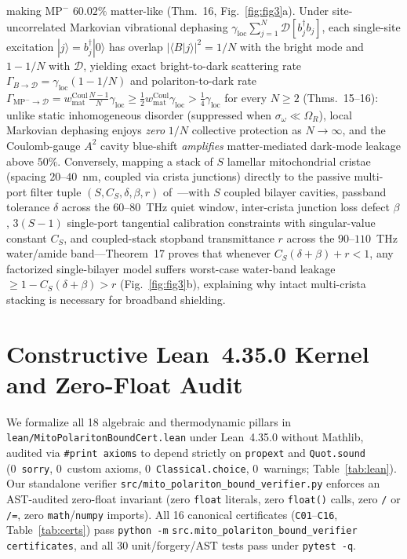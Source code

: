 \documentclass[10pt,twocolumn]{article}
\begin{document}
making $\mathrm{MP}^-$ $60.02\%$ matter-like (Thm.~16, Fig.~\ref{fig:fig3}a). Under site-uncorrelated Markovian vibrational dephasing $\gamma_{\mathrm{loc}}\sum_{j=1}^N\mathcal{D}[b_j^\dagger b_j]$, each single-site excitation $|j\rangle = b_j^\dagger|0\rangle$ has overlap $|\langle B|j\rangle|^2 = 1/N$ with the bright mode and $1 - 1/N$ with $\mathcal{D}$, yielding exact bright-to-dark scattering rate $\Gamma_{B\to\mathcal{D}} = \gamma_{\mathrm{loc}}(1-1/N)$ and polariton-to-dark rate $\Gamma_{\mathrm{MP}^-\to\mathcal{D}} = w_{\mathrm{mat}}^{\mathrm{Coul}}\frac{N-1}{N}\gamma_{\mathrm{loc}} \ge \frac{1}{2}w_{\mathrm{mat}}^{\mathrm{Coul}}\gamma_{\mathrm{loc}} > \frac{1}{4}\gamma_{\mathrm{loc}}$ for every $N \ge 2$ (Thms.~15--16): unlike static inhomogeneous disorder (suppressed when $\sigma_\omega \ll \Omega_R$), local Markovian dephasing enjoys \emph{zero} $1/N$ collective protection as $N\to\infty$, and the Coulomb-gauge $A^2$ cavity blue-shift \emph{amplifies} matter-mediated dark-mode leakage above $50\%$. Conversely, mapping a stack of $S$ lamellar mitochondrial cristae (spacing $20$--$40$~nm, coupled via crista junctions) directly to the passive multi-port filter tuple $(S, C_S, \delta, \beta, r)$ of~\cite{Eriksson2026PassiveNetworks}---with $S$ coupled bilayer cavities, passband tolerance $\delta$ across the $60$--$80$~THz quiet window, inter-crista junction loss defect $\beta$, $3(S-1)$ single-port tangential calibration constraints with singular-value constant $C_S$, and coupled-stack stopband transmittance $r$ across the $90$--$110$~THz water/amide band---Theorem~17 proves that whenever $C_S(\delta+\beta)+r < 1$, any factorized single-bilayer model suffers worst-case water-band leakage $\ge 1 - C_S(\delta+\beta) > r$ (Fig.~\ref{fig:fig3}b), explaining why intact multi-crista stacking is necessary for broadband shielding.

\section{Constructive Lean~4.35.0 Kernel and Zero-Float Audit}
We formalize all 18 algebraic and thermodynamic pillars in \texttt{lean/\allowbreak MitoPolaritonBoundCert.lean} under Lean~4.35.0 without Mathlib, audited via \texttt{\#print axioms} to depend strictly on \texttt{propext} and \texttt{Quot.sound} (0~\texttt{sorry}, 0~custom axioms, 0~\texttt{Classical.choice}, 0~warnings; Table~\ref{tab:lean}). Our standalone verifier \texttt{src/\allowbreak mito\_polariton\_bound\_verifier.py} enforces an AST-audited zero-float invariant (zero \texttt{float} literals, zero \texttt{float()} calls, zero \texttt{/} or \texttt{/=}, zero \texttt{math}/\texttt{numpy} imports). All 16 canonical certificates (\texttt{C01}--\texttt{C16}, Table~\ref{tab:certs}) pass \texttt{python -m} \nolinkurl{src.mito_polariton_bound_verifier} \texttt{certificates}, and all 30 unit/forgery/AST tests pass under \texttt{pytest -q}.
\end{document}

